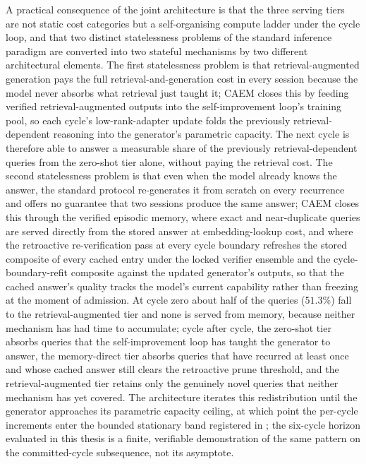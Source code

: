 A practical consequence of the joint architecture is that the three serving tiers are not static cost categories but a self-organising compute ladder under the cycle loop, and that two distinct statelessness problems of the standard inference paradigm are converted into two stateful mechanisms by two different architectural elements. The first statelessness problem is that retrieval-augmented generation pays the full retrieval-and-generation cost in every session because the model never absorbs what retrieval just taught it; CAEM closes this by feeding verified retrieval-augmented outputs into the self-improvement loop's training pool, so each cycle's low-rank-adapter update folds the previously retrieval-dependent reasoning into the generator's parametric capacity. The next cycle is therefore able to answer a measurable share of the previously retrieval-dependent queries from the zero-shot tier alone, without paying the retrieval cost. The second statelessness problem is that even when the model already knows the answer, the standard protocol re-generates it from scratch on every recurrence and offers no guarantee that two sessions produce the same answer; CAEM closes this through the verified episodic memory, where exact and near-duplicate queries are served directly from the stored answer at embedding-lookup cost, and where the retroactive re-verification pass at every cycle boundary refreshes the stored composite of every cached entry under the locked verifier ensemble and the cycle-boundary-refit composite against the updated generator's outputs, so that the cached answer's quality tracks the model's current capability rather than freezing at the moment of admission. At cycle zero about half of the queries ($51.3\%$) fall to the retrieval-augmented tier and none is served from memory, because neither mechanism has had time to accumulate; cycle after cycle, the zero-shot tier absorbs queries that the self-improvement loop has taught the generator to answer, the memory-direct tier absorbs queries that have recurred at least once and whose cached answer still clears the retroactive prune threshold, and the retrieval-augmented tier retains only the genuinely novel queries that neither mechanism has yet covered. The architecture iterates this redistribution until the generator approaches its parametric capacity ceiling, at which point the per-cycle increments enter the bounded stationary band registered in ; the six-cycle horizon evaluated in this thesis is a finite, verifiable demonstration of the same pattern on the committed-cycle subsequence, not its asymptote.

